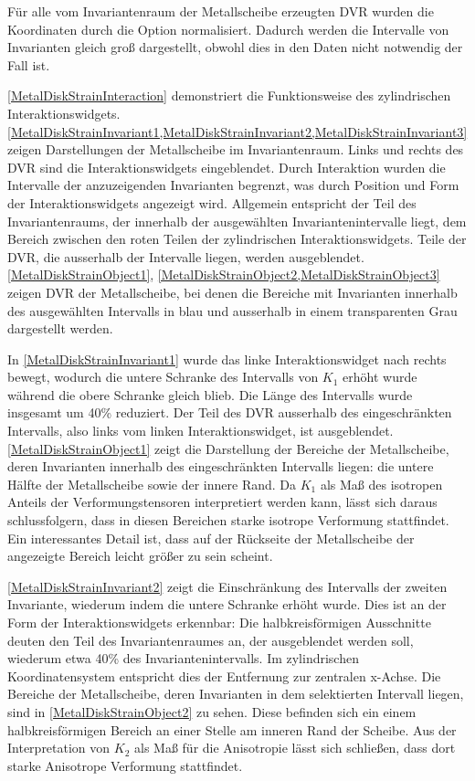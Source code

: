 \documentclass[a4paper,fontsize=12pt,toc=bib,halfparskip,ngerman]{scrartcl}
\begin{document}
F\"ur alle vom Invariantenraum der Metallscheibe erzeugten DVR wurden die Koordinaten durch die Option normalisiert. Dadurch werden die Intervalle von Invarianten gleich gro{\ss} dargestellt, obwohl dies in den Daten nicht notwendig der Fall ist.

\cref{MetalDiskStrainInteraction} demonstriert die Funktionsweise des zylindrischen Interaktionswidgets. \cref{MetalDiskStrainInvariant1,MetalDiskStrainInvariant2,MetalDiskStrainInvariant3} zeigen Darstellungen der Metallscheibe im Invariantenraum. Links und rechts des DVR sind die Interaktionswidgets eingeblendet. Durch Interaktion wurden die Intervalle der anzuzeigenden Invarianten begrenzt, was durch Position und Form der Interaktionswidgets angezeigt wird. Allgemein entspricht der Teil des Invariantenraums, der innerhalb der ausgew\"ahlten Invariantenintervalle liegt, dem Bereich zwischen den roten Teilen der zylindrischen Interaktionswidgets. Teile der DVR, die ausserhalb der Intervalle liegen, werden ausgeblendet. \cref{MetalDiskStrainObject1}, \cref{MetalDiskStrainObject2,MetalDiskStrainObject3} zeigen DVR der Metallscheibe, bei denen die Bereiche mit Invarianten innerhalb des ausgew\"ahlten Intervalls in blau und ausserhalb in einem transparenten Grau dargestellt werden.

In \cref{MetalDiskStrainInvariant1} wurde das linke Interaktionswidget nach rechts bewegt, wodurch die untere Schranke des Intervalls von $K_1$ erh\"oht wurde w\"ahrend die obere Schranke gleich blieb. Die L\"ange des Intervalls wurde insgesamt um 40\% reduziert. Der Teil des DVR ausserhalb des eingeschr\"ankten Intervalls, also links vom linken Interaktionswidget, ist ausgeblendet. \cref{MetalDiskStrainObject1} zeigt die Darstellung der Bereiche der Metallscheibe, deren Invarianten innerhalb des eingeschr\"ankten Intervalls liegen: die untere H\"alfte der Metallscheibe sowie der innere Rand. Da $K_1$ als Ma{\ss} des isotropen Anteils der Verformungstensoren interpretiert werden kann, l\"asst sich daraus schlussfolgern, dass in diesen Bereichen starke isotrope Verformung stattfindet. Ein interessantes Detail ist, dass auf der R\"uckseite der Metallscheibe der angezeigte Bereich leicht gr\"o{\ss}er zu sein scheint.

\cref{MetalDiskStrainInvariant2} zeigt die Einschr\"ankung des Intervalls der zweiten Invariante, wiederum indem die untere Schranke erh\"oht wurde. Dies ist an der Form der Interaktionswidgets erkennbar: Die halbkreisf\"ormigen Ausschnitte deuten den Teil des Invariantenraumes an, der ausgeblendet werden soll, wiederum etwa 40\% des Invariantenintervalls.  Im zylindrischen Koordinatensystem entspricht dies der Entfernung zur zentralen x-Achse. Die Bereiche der Metallscheibe, deren Invarianten in dem selektierten Intervall liegen, sind in \cref{MetalDiskStrainObject2} zu sehen. Diese befinden sich ein einem halbkreisf\"ormigen Bereich an einer Stelle am inneren Rand der Scheibe. Aus der Interpretation von $K_2$ als Ma{\ss} f\"ur die Anisotropie l\"asst sich schlie{\ss}en, dass dort starke Anisotrope Verformung stattfindet.
\end{document}
